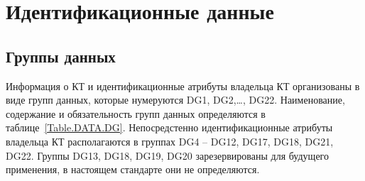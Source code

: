 \chapter{Идентификационные данные}\label{DATA}

\section{Группы данных}\label{DATA.DG}

Информация о КТ и идентификационные атрибуты владельца КТ организованы в 
виде групп данных, которые нумеруются DG1, DG2,\ldots, DG22. 
Наименование, содержание и обязательность групп данных определяются в 
таблице~\ref{Table.DATA.DG}. 
%
Непосредстенно идентификационные атрибуты владельца КТ располагаются 
в группах DG4 -- DG12, DG17, DG18, DG21, DG22. 
Группы DG13, DG18, DG19, DG20 зарезервированы для будущего 
применения, в настоящем стандарте они не определяются. 

